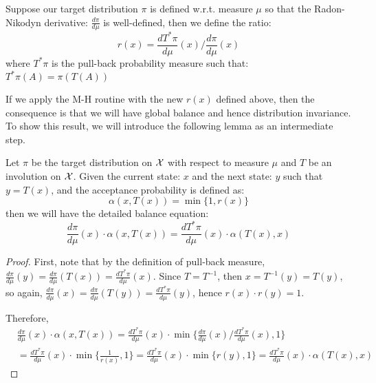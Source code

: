 \documentclass{article}
\begin{document}
Suppose our target distribution $\pi$ is defined w.r.t. measure $\mu$ so that the Radon-Nikodyn derivative: $\frac{d\pi}{d\mu}$ is well-defined, then we define the ratio: \[r(x) = \frac{d T^*\pi}{d\mu}(x) / \frac{d\pi}{d\mu}(x)\]where $T^*\pi$ is the pull-back probability measure such that: $T^*\pi(A) = \pi(T(A))$

If we apply the M-H routine with the new $r(x)$ defined above, then the consequence is that we will have global balance and hence distribution invariance. To show this result, we will introduce the following lemma as an intermediate step.

\begin{lemma}\label{lemma_invol}
Let $\pi$ be the target distribution on ${\cal X}$ with respect to measure $\mu$ and $T$ be an involution on ${\cal X}$. Given the current state: $x$ and the next state: $y$ such that $y = T(x)$, and the acceptance probability is defined as:  
\[\alpha(x, T(x)) = \min\{1, r(x)\}\]
then we will have the detailed balance equation: 
\[\frac{d\pi}{d\mu}(x) \cdot \alpha(x, T(x)) = \frac{d T^*\pi}{d\mu}(x)\cdot\alpha(T(x), x)\]
\end{lemma}

\begin{proof}
First, note that by the definition of pull-back measure, $\frac{d\pi}{d\mu}(y) = \frac{d\pi}{d\mu}(T(x)) = \frac{d T^*\pi}{d\mu}(x)$. Since $T = T^{-1}$, then $x = T^{-1}(y) = T(y)$, so again, $\frac{d\pi}{d\mu}(x) = \frac{d\pi}{d\mu}(T(y)) = \frac{d T^*\pi}{d\mu}(y)$, hence $r(x) \cdot r(y) = 1$.

Therefore, \begin{align*}
& \frac{d\pi}{d\mu}(x) \cdot \alpha(x, T(x)) = \frac{d T^*\pi}{d\mu}(x) \cdot \min\Big\{\frac{d\pi}{d\mu}(x) / \frac{d T^*\pi}{d\mu}(x), 1\Big\}\\
& = \frac{d T^*\pi}{d\mu}(x) \cdot\min\Big\{\frac{1}{r(x)}, 1\Big\} = \frac{d T^*\pi}{d\mu}(x) \cdot\min\{r(y), 1\} = \frac{d T^*\pi}{d\mu}(x)\cdot\alpha(T(x), x)
\end{align*}

\end{proof}

\end{document}

